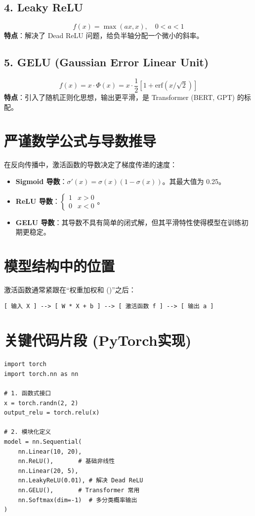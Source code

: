 \documentclass[12pt, a4paper]{book}
\begin{document}
\subsection{4. Leaky ReLU}
$$ f(x) = \max(ax, x), \quad 0 < a < 1 $$
\textbf{特点}：解决了 Dead ReLU 问题，给负半轴分配一个微小的斜率。

\subsection{5. GELU (Gaussian Error Linear Unit)}
$$ f(x) = x \cdot \Phi(x) = x \cdot \frac{1}{2} [1 + \text{erf}(x/\sqrt{2})] $$
\textbf{特点}：引入了随机正则化思想，输出更平滑，是 Transformer (BERT, GPT) 的标配。

\section{严谨数学公式与导数推导}
在反向传播中，激活函数的导数决定了梯度传递的速度：

\begin{itemize}
    \item \textbf{Sigmoid 导数}：$\sigma'(x) = \sigma(x)(1 - \sigma(x))$。其最大值为 0.25。
    \item \textbf{ReLU 导数}：$\begin{cases} 1 & x > 0 \\ 0 & x < 0 \end{cases}$。
    \item \textbf{GELU 导数}：其导数不具有简单的闭式解，但其平滑特性使得模型在训练初期更稳定。
\end{itemize}

\section{模型结构中的位置}
激活函数通常紧跟在“权重加权和 ()”之后：
\begin{verbatim}
[ 输入 X ] --> [ W * X + b ] --> [ 激活函数 f ] --> [ 输出 a ]
\end{verbatim}

\section{关键代码片段 (PyTorch实现)}
\begin{lstlisting}
import torch
import torch.nn as nn

# 1. 函数式接口
x = torch.randn(2, 2)
output_relu = torch.relu(x)

# 2. 模块化定义
model = nn.Sequential(
    nn.Linear(10, 20),
    nn.ReLU(),       # 基础非线性
    nn.Linear(20, 5),
    nn.LeakyReLU(0.01), # 解决 Dead ReLU
    nn.GELU(),       # Transformer 常用
    nn.Softmax(dim=-1)  # 多分类概率输出
)
\end{lstlisting}
\end{document}
